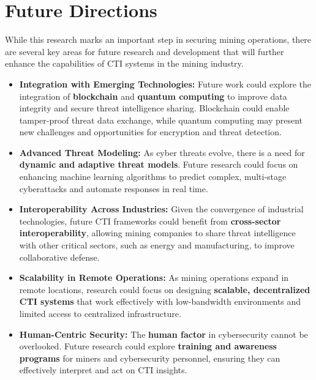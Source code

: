 \documentclass[a4paper,twoside,12pt]{report}
\begin{document}
\section*{Future Directions}

While this research marks an important step in securing mining operations, there are several key areas for future research and development that will further enhance the capabilities of CTI systems in the mining industry. 

\begin{itemize}
    \item \textbf{Integration with Emerging Technologies:} Future work could explore the integration of \textbf{blockchain} and \textbf{quantum computing} to improve data integrity and secure threat intelligence sharing. Blockchain could enable tamper-proof threat data exchange, while quantum computing may present new challenges and opportunities for encryption and threat detection.
    
    \item \textbf{Advanced Threat Modeling:} As cyber threats evolve, there is a need for \textbf{dynamic and adaptive threat models}. Future research could focus on enhancing machine learning algorithms to predict complex, multi-stage cyberattacks and automate responses in real time.
    
    \item \textbf{Interoperability Across Industries:} Given the convergence of industrial technologies, future CTI frameworks could benefit from \textbf{cross-sector interoperability}, allowing mining companies to share threat intelligence with other critical sectors, such as energy and manufacturing, to improve collaborative defense.
    
    \item \textbf{Scalability in Remote Operations:} As mining operations expand in remote locations, research could focus on designing \textbf{scalable, decentralized CTI systems} that work effectively with low-bandwidth environments and limited access to centralized infrastructure.
    
    \item \textbf{Human-Centric Security:} The \textbf{human factor} in cybersecurity cannot be overlooked. Future research could explore \textbf{training and awareness programs} for miners and cybersecurity personnel, ensuring they can effectively interpret and act on CTI insights.
\end{itemize}
\end{document}

